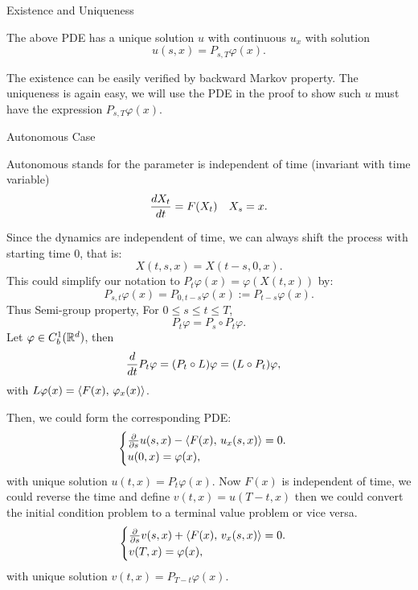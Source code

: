 \begin{thm}{Existence and Uniqueness}

The above PDE has a unique solution $u$ with continuous $u_x$ with solution
\begin{equation*}
    u(s,x) = P_{s,T}\varphi (x).
\end{equation*}
\end{thm}

The existence can be easily verified by backward Markov property. The uniqueness is again easy, we will use the PDE in the proof to show such $u$ must have the expression $P_{s,T}\varphi(x)$.

\begin{example}{Autonomous Case}

Autonomous stands for the parameter is independent of time (invariant with time variable)
\begin{equation*}
    \frac{\mathop{}\!d X_t}{\mathop{}\!d t} = F(X_t) \quad X_s = x.
\end{equation*}

Since the dynamics are independent of time, we can always shift the process with starting time $0$, that is:
\begin{equation*}
    X(t,s,x) = X(t-s, 0, x).
\end{equation*}
This could simplify our notation to $\boxed{P_t\varphi (x) = \varphi(X(t,x))}$ by:
\begin{equation*}
    P_{s,t}\varphi (x) = P_{0,t-s} \varphi(x) := P_{t-s}\varphi(x).
\end{equation*}
Thus Semi-group property, For $0\leq s\leq t\leq T$,
\begin{equation*}
    P_{t}\varphi = P_{s}\circ P_{t} \varphi.
\end{equation*}
Let $\varphi \in C_b^1(\mathbb{R}^d)$, then
\begin{align*}
    \frac{\mathop{}\!d}{\mathop{}\!d t} P_{t}\varphi &= (P_{t}\circ L)\varphi = (L \circ P_{t})\varphi,
\end{align*}
with $L\varphi(x) = \langle {F(x)},\,{\varphi_x(x)} \rangle$.
\end{example}
Then, we could form the corresponding PDE:
\begin{equation*}
    \begin{cases}
        \frac{\partial }{\partial s}u(s,x) - \langle {F(x)},\,{u_x(s,x)} \rangle=0. \\
        u(0,x) = \varphi(x),
    \end{cases}
\end{equation*}
with unique solution $u(t,x) = P_t\varphi(x)$. Now $F(x)$ is independent of time, we could reverse the time and define $v(t,x) = u(T-t, x)$ then we could convert the initial condition problem to a terminal value problem or vice versa.
\begin{equation*}
    \begin{cases}
        \frac{\partial }{\partial s}v(s,x) + \langle {F(x)},\,{v_x(s,x)} \rangle=0. \\
        v(T,x) = \varphi(x),
    \end{cases}
\end{equation*}
with unique solution $v(t,x) = P_{T-t}\varphi(x)$.

